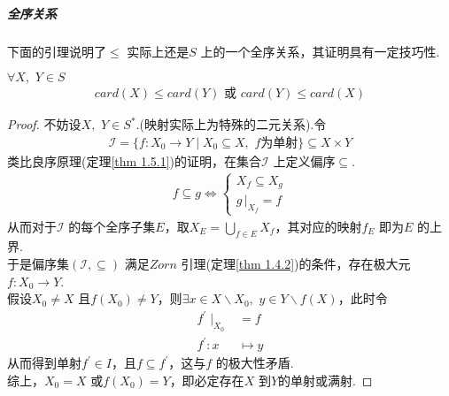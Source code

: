 		\vspace*{2em}
		\subparagraph{全序关系}
		下面的引理说明了$\leq$ 实际上还是$S$ 上的一个全序关系，其证明具有一定技巧性.
		\begin{lemma}\label{lemma 1.6.2}
			$\forall X , \,\, Y \in S$
			\begin{align}
				card(X) \leq card(Y) \,\, \text{或} \,\, card(Y) \leq card(X)
			\end{align}
			\begin{proof}
				不妨设$X , \,\, Y \in S^*$.(映射实际上为特殊的二元关系).令
				\begin{align}
					\mathcal{I} = \{ f : X_0 \longrightarrow Y \mid X_0 \subseteq X , \,\, f \text{为单射} \} \subseteq X \times Y
				\end{align}
				类比良序原理(定理\ref{thm 1.5.1})的证明，在集合$\mathcal{I}$ 上定义偏序$\subseteq$.
				\begin{align}
					f \subseteq g \Leftrightarrow \begin{cases}
						X_f \subseteq X_g\\
						g \, \Big|_{X_f} = f
					\end{cases}
				\end{align}
				从而对于$\mathcal{I}$ 的每个全序子集$E$，取$X_E = \underset{f \in E}{\bigcup}{X_f}$，其对应的映射$f_E$ 即为$E$ 的上界.\\
				于是偏序集$(\mathcal{I} , \subseteq)$ 满足$Zorn$ 引理(定理\ref{thm 1.4.2})的条件，存在极大元$f : X_0 \longrightarrow Y$.\\
				假设$X_0 \neq X$ 且$f(X_0) \neq Y$，则$\exists x \in X \backslash X_0 , \,\, y \in Y \backslash f(X)$，此时令
				\begin{align}
					f^{'} \mid_{X_0} &= f\\
					f^{'} : x &\longmapsto y
				\end{align}
				从而得到单射$f^{'} \in I$，且$f \subseteq f^{'}$，这与$f$ 的极大性矛盾.\\
				综上，$X_0 = X$ 或$f(X_0) = Y$，即必定存在$X$ 到$Y$的单射或满射.
			\end{proof}
		\end{lemma}
	
